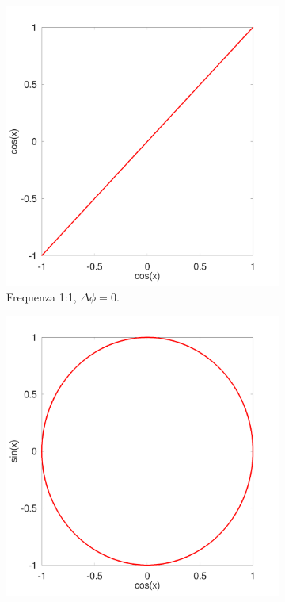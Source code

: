 \documentclass[12pt,twoside,openright]{report}
\begin{document}
\begin{figure}[h!]
\centering
\begin{subfigure}{0.48\textwidth}
    \includegraphics[width=\textwidth]{lissajous1.png}
    \caption{Frequenza 1:1, $\Delta \phi= 0$.}
    \label{fig:second}
\end{subfigure}
\hfill
\begin{subfigure}{0.48\textwidth}
    \includegraphics[width=\textwidth]{lissajous2.png}

\end{subfigure}
\end{figure}
\end{document}
